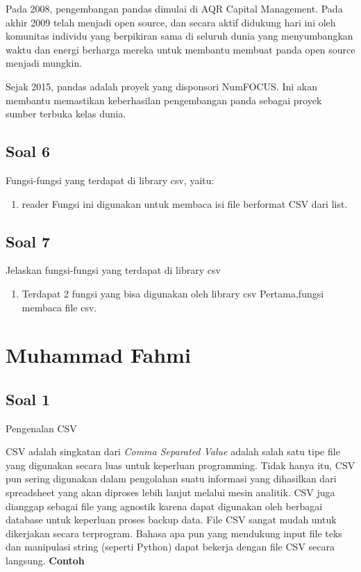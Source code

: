 Pada 2008, pengembangan pandas dimulai di AQR Capital Management. Pada akhir 2009 telah menjadi open source, dan secara aktif didukung hari ini oleh komunitas individu yang berpikiran sama di seluruh dunia yang menyumbangkan waktu dan energi berharga mereka untuk membantu membuat panda open source menjadi mungkin.

Sejak 2015, pandas adalah proyek yang disponsori NumFOCUS. Ini akan membantu memastikan keberhasilan pengembangan panda sebagai proyek sumber terbuka kelas dunia.

\subsection{Soal 6}
Fungsi-fungsi yang terdapat di library csv, yaitu:
\begin{enumerate}
	\item reader
	Fungsi ini digunakan untuk membaca isi file berformat CSV dari list.
\end{enumerate}

\subsection{Soal 7}
Jelaskan fungsi-fungsi yang terdapat di library csv
\begin{enumerate}
	\item Terdapat 2 fungsi yang bisa digunakan oleh library csv
	Pertama,fungsi membaca file csv.
\end{enumerate}


\section{Muhammad Fahmi}
\subsection{Soal 1}
Pengenalan CSV

CSV adalah singkatan dari \textit{Comma Separated Value} adalah salah satu tipe file yang digunakan secara luas untuk keperluan programming. Tidak hanya itu, CSV pun sering digunakan dalam pengolahan suatu informasi yang dihasilkan dari spreadsheet yang akan diproses lebih lanjut melalui mesin analitik. CSV juga dianggap sebagai file yang agnostik karena dapat digunakan oleh berbagai database untuk keperluan proses backup data. File CSV sangat mudah untuk dikerjakan secara terprogram. Bahasa apa pun yang mendukung input file teks dan manipulasi string (seperti Python) dapat bekerja dengan file CSV secara langsung.
\textbf{Contoh}


